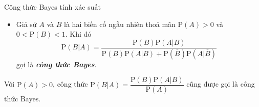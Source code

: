 \begin{dang}{Công thức Bayes tính xác suất}
	\begin{itemize}
		\item Giả sử $A$ và $B$ là hai biến cố ngẫu nhiên thoả mãn $\mathrm{P}(A) > 0$ và $0 < \mathrm{P}(B) < 1$. Khi đó
		$$\mathrm{P}(B|A)=\dfrac{\mathrm{P}(B)\mathrm{P}(A|B)}{\mathrm{P}(B)\mathrm{P}(A|B)+\mathrm{P}(\overline{B})\mathrm{P}(A|\overline{B})}$$ gọi là \textbf{\textit{công thức Bayes}}.
	\end{itemize}
	\begin{note}
		Với $\mathrm{P}(A) > 0$, công thức $\mathrm{P}(B|A)=\dfrac{\mathrm{P}(B)\mathrm{P}(A|B)}{\mathrm{P}(A)}$ cũng được gọi là công thức Bayes.
	\end{note}
\end{dang}
